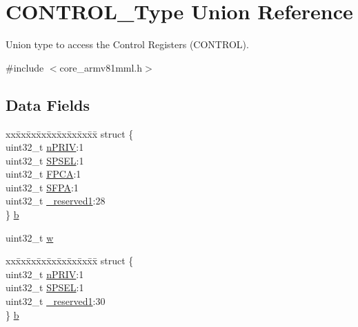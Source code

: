 \hypertarget{union_c_o_n_t_r_o_l___type}{}\section{C\+O\+N\+T\+R\+O\+L\+\_\+\+Type Union Reference}
\label{union_c_o_n_t_r_o_l___type}


Union type to access the Control Registers (C\+O\+N\+T\+R\+OL).  




{\ttfamily \#include $<$core\+\_\+armv81mml.\+h$>$}

\subsection*{Data Fields}
\begin{DoxyCompactItemize}
\item 
\begin{tabbing}
xx\=xx\=xx\=xx\=xx\=xx\=xx\=xx\=xx\=\kill
struct \{\\
\>uint32\_t \mbox{\hyperlink{union_c_o_n_t_r_o_l___type_a2a6e513e8a6bf4e58db169e312172332}{nPRIV}}:1\\
\>uint32\_t \mbox{\hyperlink{union_c_o_n_t_r_o_l___type_ae185aac93686ffc78e998a9daf41415b}{SPSEL}}:1\\
\>uint32\_t \mbox{\hyperlink{union_c_o_n_t_r_o_l___type_a2518558c090f60161ba4e718a54ee468}{FPCA}}:1\\
\>uint32\_t \mbox{\hyperlink{union_c_o_n_t_r_o_l___type_a40e45b21a6a619be3b6d5ce9c5bc5ffb}{SFPA}}:1\\
\>uint32\_t \mbox{\hyperlink{union_c_o_n_t_r_o_l___type_a959a73d8faee56599b7e792a7c5a2d16}{\_reserved1}}:28\\
\} \mbox{\hyperlink{union_c_o_n_t_r_o_l___type_ab2a41711c248a319c2e7d0ab73c3a8b9}{b}}\\

\end{tabbing}\item 
uint32\+\_\+t \mbox{\hyperlink{union_c_o_n_t_r_o_l___type_ad0fb62e7a08e70fc5e0a76b67809f84b}{w}}
\item 
\begin{tabbing}
xx\=xx\=xx\=xx\=xx\=xx\=xx\=xx\=xx\=\kill
struct \{\\
\>uint32\_t \mbox{\hyperlink{union_c_o_n_t_r_o_l___type_a2a6e513e8a6bf4e58db169e312172332}{nPRIV}}:1\\
\>uint32\_t \mbox{\hyperlink{union_c_o_n_t_r_o_l___type_ae185aac93686ffc78e998a9daf41415b}{SPSEL}}:1\\
\>uint32\_t \mbox{\hyperlink{union_c_o_n_t_r_o_l___type_a959a73d8faee56599b7e792a7c5a2d16}{\_reserved1}}:30\\
\} \mbox{\hyperlink{union_c_o_n_t_r_o_l___type_a77cf8ebbef978831a049d0e12e991695}{b}}\\


\end{tabbing}
\end{DoxyCompactItemize}
